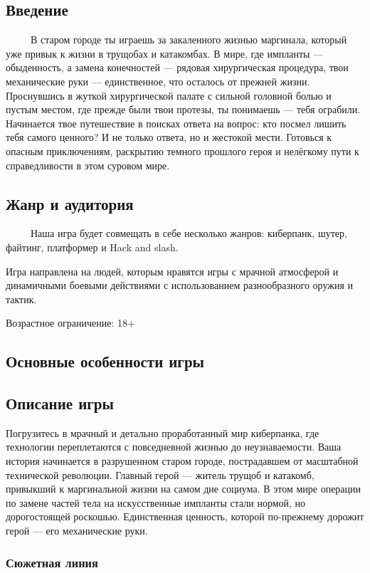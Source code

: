 \documentclass{article}
\begin{document}
\subsection{Введение}
\ \ \ \ \ В старом городе ты играешь за закаленного жизнью маргинала, который уже привык к жизни в трущобах и катакомбах. В мире, где импланты — обыденность, а замена конечностей — рядовая хирургическая процедура, твои механические руки — единственное, что осталось от прежней жизни. Проснувшись в жуткой хирургической палате с сильной головной болью и пустым местом, где прежде были твои протезы, ты понимаешь — тебя ограбили. Начинается твое путешествие в поисках ответа на вопрос: кто посмел лишить тебя самого ценного? И не только ответа, но и жестокой мести. Готовься к опасным приключениям, раскрытию темного прошлого героя и нелёгкому пути к справедливости в этом суровом мире.
\subsection{Жанр и аудитория}
\ \ \ \ \ Наша игра будет совмещать в себе несколько жанров: киберпанк, шутер, файтинг, платформер и Hack and slash.

Игра направлена на людей, которым нравятся игры с  мрачной атмосферой и динамичными боевыми действиями с использованием разнообразного оружия и тактик. 

Возрастное ограничение: 18+
\subsection{Основные особенности игры}

\subsection{Описание игры}
Погрузитесь в мрачный и детально проработанный мир киберпанка, где технологии переплетаются с повседневной жизнью до неузнаваемости. Ваша история начинается в разрушенном старом городе, пострадавшем от масштабной технической революции. Главный герой — житель трущоб и катакомб, привыкший к маргинальной жизни на самом дне социума. В этом мире операции по замене частей тела на искусственные импланты стали нормой, но дорогостоящей роскошью. Единственная ценность, которой по-прежнему дорожит герой — его механические руки.

\subsubsection{Сюжетная линия}
\end{document}
